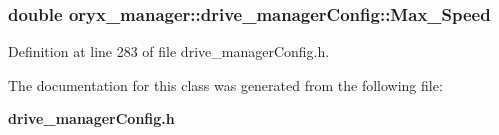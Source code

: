 \subsubsection[{\-Max\-\_\-\-Speed}]{\setlength{\rightskip}{0pt plus 5cm}double {\bf oryx\-\_\-manager\-::drive\-\_\-manager\-Config\-::\-Max\-\_\-\-Speed}}\label{classoryx__manager_1_1drive__managerConfig_affaedf6562793ea45c93231e337bfec7}


\-Definition at line 283 of file drive\-\_\-manager\-Config.\-h.



\-The documentation for this class was generated from the following file\-:\begin{DoxyCompactItemize}
\item 
{\bf drive\-\_\-manager\-Config.\-h}\end{DoxyCompactItemize}
